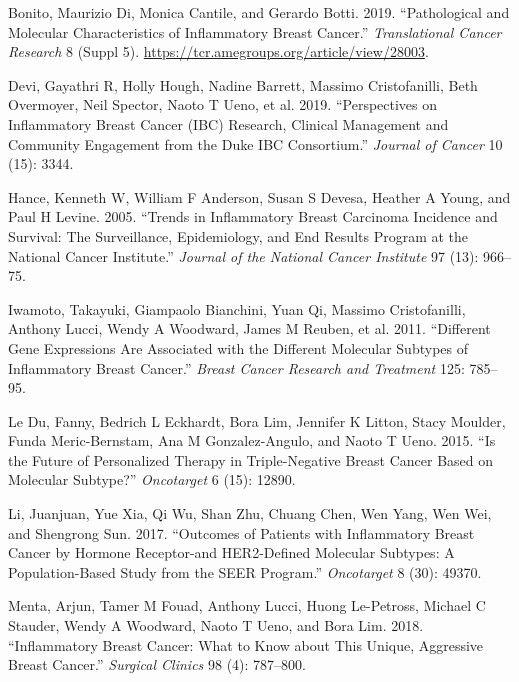 \documentclass[
  letterpaper,
  DIV=11,
  numbers=noendperiod]{scrartcl}
\newlength{\cslhangindent}
\newenvironment{CSLReferences}[2] %
 {\begin{list}{}{%
  \setlength{\itemindent}{0pt}
  \setlength{\leftmargin}{0pt}
  \setlength{\parsep}{0pt}
  \ifodd #1
   \setlength{\leftmargin}{\cslhangindent}
   \setlength{\itemindent}{-1\cslhangindent}
  \fi
  \setlength{\itemsep}{#2\baselineskip}}}
 {\end{list}}
\begin{document}
\label{refs}
\begin{CSLReferences}{1}{0}
Bonito, Maurizio Di, Monica Cantile, and Gerardo Botti. 2019.
{``Pathological and Molecular Characteristics of Inflammatory Breast
Cancer.''} \emph{Translational Cancer Research} 8 (Suppl 5).
\url{https://tcr.amegroups.org/article/view/28003}.

Devi, Gayathri R, Holly Hough, Nadine Barrett, Massimo Cristofanilli,
Beth Overmoyer, Neil Spector, Naoto T Ueno, et al. 2019. {``Perspectives
on Inflammatory Breast Cancer (IBC) Research, Clinical Management and
Community Engagement from the Duke IBC Consortium.''} \emph{Journal of
Cancer} 10 (15): 3344.

Hance, Kenneth W, William F Anderson, Susan S Devesa, Heather A Young,
and Paul H Levine. 2005. {``Trends in Inflammatory Breast Carcinoma
Incidence and Survival: The Surveillance, Epidemiology, and End Results
Program at the National Cancer Institute.''} \emph{Journal of the
National Cancer Institute} 97 (13): 966--75.

Iwamoto, Takayuki, Giampaolo Bianchini, Yuan Qi, Massimo Cristofanilli,
Anthony Lucci, Wendy A Woodward, James M Reuben, et al. 2011.
{``Different Gene Expressions Are Associated with the Different
Molecular Subtypes of Inflammatory Breast Cancer.''} \emph{Breast Cancer
Research and Treatment} 125: 785--95.

Le Du, Fanny, Bedrich L Eckhardt, Bora Lim, Jennifer K Litton, Stacy
Moulder, Funda Meric-Bernstam, Ana M Gonzalez-Angulo, and Naoto T Ueno.
2015. {``Is the Future of Personalized Therapy in Triple-Negative Breast
Cancer Based on Molecular Subtype?''} \emph{Oncotarget} 6 (15): 12890.

Li, Juanjuan, Yue Xia, Qi Wu, Shan Zhu, Chuang Chen, Wen Yang, Wen Wei,
and Shengrong Sun. 2017. {``Outcomes of Patients with Inflammatory
Breast Cancer by Hormone Receptor-and HER2-Defined Molecular Subtypes: A
Population-Based Study from the SEER Program.''} \emph{Oncotarget} 8
(30): 49370.

Menta, Arjun, Tamer M Fouad, Anthony Lucci, Huong Le-Petross, Michael C
Stauder, Wendy A Woodward, Naoto T Ueno, and Bora Lim. 2018.
{``Inflammatory Breast Cancer: What to Know about This Unique,
Aggressive Breast Cancer.''} \emph{Surgical Clinics} 98 (4): 787--800.


\end{CSLReferences}
\end{document}
